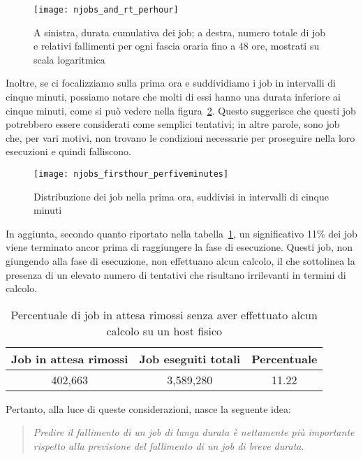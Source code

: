 \begin{figure}[p]
    \centering
    \texttt{[image: njobs\_and\_rt\_perhour]}
    \caption{\small A sinistra, durata cumulativa dei job; a destra, numero
    totale di job e relativi fallimenti per ogni fascia oraria fino a 48 ore,
mostrati su scala logaritmica}
    \label{fig:njobs_and_rt_perhour}
\end{figure}

Inoltre, se ci focalizziamo sulla prima ora e suddividiamo i job in intervalli
di cinque minuti, possiamo notare che molti di essi hanno una durata inferiore
ai cinque minuti, come si può vedere nella figura~\ref{fig:jobs_firsthour}.
Questo suggerisce che questi job potrebbero essere considerati come semplici
tentativi; in altre parole, sono job che, per vari motivi, non trovano le
condizioni necessarie per proseguire nella loro esecuzioni e quindi
falliscono.

\begin{figure}[p]
   \centering
   \texttt{[image: njobs\_firsthour\_perfiveminutes]}
   \caption{\small Distribuzione dei job nella prima ora, suddivisi in intervalli di
   cinque minuti}
   \label{fig:jobs_firsthour}
\end{figure}

In aggiunta, secondo quanto riportato nella
tabella~\ref{table:pending_jobs_removed}, un significativo 11\% dei job viene
terminato ancor prima di raggiungere la fase di esecuzione. Questi job, non
giungendo alla fase di esecuzione, non effettuano alcun calcolo, il che
sottolinea la presenza di un elevato numero di tentativi che risultano
irrilevanti in termini di calcolo.

\begin{table}[!h]
    \caption{Percentuale di job in attesa rimossi senza aver effettuato alcun
    calcolo su un host fisico}
    \centering
    \begin{tabular}{ccc}
        \toprule
        \textbf{Job in attesa rimossi} & \textbf{Job eseguiti totali} &
        \textbf{Percentuale} \\
        \midrule
        402,663 & 3,589,280 & 11.22 \\
        \bottomrule
    \end{tabular}
    \label{table:pending_jobs_removed}
\end{table}

Pertanto, alla luce di queste considerazioni, nasce la seguente idea:
\begin{quote}
    \emph{Predire il fallimento di un job di lunga durata è nettamente più
    importante rispetto alla previsione del fallimento di un job di breve durata}.
\end{quote}



